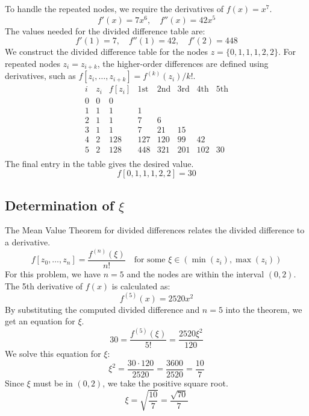 \documentclass[a4paper]{article}
\begin{document}
To handle the repeated nodes, we require the derivatives of $f(x)=x^7$.
\[
f'(x) = 7x^6, \quad f''(x) = 42x^5
\]
The values needed for the divided difference table are:
\[
f'(1)=7, \quad f''(1)=42, \quad f'(2)=448
\]
We construct the divided difference table for the nodes $z = \{0, 1, 1, 1, 2, 2\}$. For repeated nodes $z_i=z_{i+k}$, the higher-order differences are defined using derivatives, such as $f[z_i, \dots, z_{i+k}] = f^{(k)}(z_i)/k!$.
\[
\begin{array}{c|c|cccccc}
i & z_i & f[z_i] & \text{1st} & \text{2nd} & \text{3rd} & \text{4th} & \text{5th} \\
\hline
0 & 0 & 0 & & & & & \\
1 & 1 & 1 & 1 & & & & \\
2 & 1 & 1 & 7 & 6 & & & \\
3 & 1 & 1 & 7 & 21 & 15 & & \\
4 & 2 & 128 & 127 & 120 & 99 & 42 & \\
5 & 2 & 128 & 448 & 321 & 201 & 102 & 30 \\
\end{array}
\]
The final entry in the table gives the desired value.
\[
f[0, 1, 1, 1, 2, 2] = 30
\]

\subsection*{Determination of $\xi$}

The Mean Value Theorem for divided differences relates the divided difference to a derivative.
\[
f[z_0, \dots, z_n] = \frac{f^{(n)}(\xi)}{n!} \quad \text{for some } \xi \in (\min(z_i), \max(z_i))
\]
For this problem, we have $n=5$ and the nodes are within the interval $(0,2)$. The 5th derivative of $f(x)$ is calculated as:
\[
f^{(5)}(x) = 2520x^2
\]
By substituting the computed divided difference and $n=5$ into the theorem, we get an equation for $\xi$.
\[
30 = \frac{f^{(5)}(\xi)}{5!} = \frac{2520\xi^2}{120}
\]
We solve this equation for $\xi$:
\[
\xi^2 = \frac{30 \cdot 120}{2520} = \frac{3600}{2520} = \frac{10}{7}
\]
Since $\xi$ must be in $(0,2)$, we take the positive square root.
\[
\xi = \sqrt{\frac{10}{7}} = \frac{\sqrt{70}}{7}
\]
\end{document}
